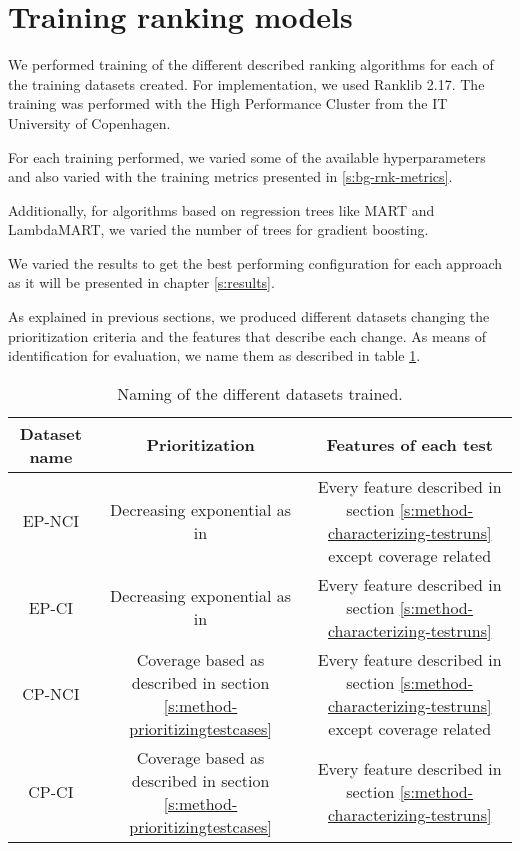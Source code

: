 \section{Training ranking models}\label{s:method-training-models}

We performed training of the different described ranking algorithms for each of the training 
datasets created. For implementation, we used Ranklib 2.17. The training was performed
with the High Performance Cluster from the IT University of Copenhagen.

For each training performed, we varied some of the available hyperparameters and
also varied with the training metrics presented in \ref{s:bg-rnk-metrics}. 

Additionally, for algorithms based on regression trees like MART and LambdaMART, we varied
the number of trees for gradient boosting.

We varied the results to get the best performing configuration for each
approach as it will be presented in chapter \ref{s:results}.

As explained in previous sections, we produced different datasets changing the prioritization
criteria and the features that describe each change. As means of identification for evaluation, 
we name them as described in table \ref{f:table-naming-datasets}.

\begin{table}[h!]
    \centering
    {\renewcommand{\arraystretch}{2.5}
    \begin{tabular}{|c|c|c|}
        \hline
        \textbf{Dataset name} & \textbf{Prioritization} & \textbf{Features of each test} \\
        \hline
        \parbox{0.12\textwidth}{EP-NCI} & \parbox{0.30\textwidth}{Decreasing exponential as in \cite{Bertolino2020LearningtoRankVR}} & \parbox{0.40\textwidth}{Every feature described in section \ref{s:method-characterizing-testruns} except coverage related} \\
        \hline
        \parbox{0.12\textwidth}{EP-CI} & \parbox{0.30\textwidth}{Decreasing exponential as in \cite{Bertolino2020LearningtoRankVR}} & \parbox{0.40\textwidth}{Every feature described in section \ref{s:method-characterizing-testruns}} \\
        \hline
        \parbox{0.12\textwidth}{CP-NCI} & \parbox{0.30\textwidth}{Coverage based as described in section \ref{s:method-prioritizingtestcases}} & \parbox{0.40\textwidth}{Every feature described in section \ref{s:method-characterizing-testruns} except coverage related} \\
        \hline
        \parbox{0.12\textwidth}{CP-CI} & \parbox{0.30\textwidth}{Coverage based as described in section \ref{s:method-prioritizingtestcases}} & \parbox{0.40\textwidth}{Every feature described in section \ref{s:method-characterizing-testruns}} \\
        \hline
    \end{tabular} }
    \caption{Naming of the different datasets trained.}
    \label{f:table-naming-datasets}
\end{table}

